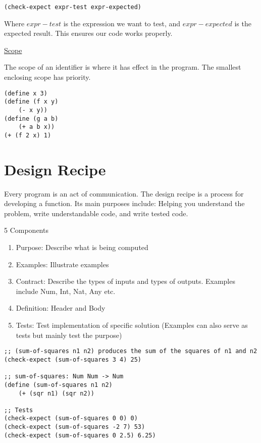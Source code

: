 \documentclass{article}
\begin{document}
\begin{lstlisting}
(check-expect expr-test expr-expected)
\end{lstlisting}

Where $expr-test$ is the expression we want to test, and $expr-expected$ is the expected result. This ensures our code works properly. 

\underline{Scope}

The scope of an identifier is where it has effect in the program. The smallest enclosing scope has priority. 

\begin{lstlisting}
(define x 3)
(define (f x y)
    (- x y))
(define (g a b)
    (+ a b x))
(+ (f 2 x) 1)
\end{lstlisting}

\section{Design Recipe}

Every program is an act of communication. The design recipe is a process for developing a function. Its main purposes include: Helping you understand the problem, write understandable code, and write tested code. 

5 Components
\begin{enumerate}
    \item Purpose: Describe what is being computed
    \item Examples: Illustrate examples
    \item Contract: Describe the types of inputs and types of outputs. Examples include Num, Int, Nat, Any etc.
    \item Definition: Header and Body
    \item Tests: Test implementation of specific solution (Examples can also serve as tests but mainly test the purpose)
\end{enumerate}

\begin{lstlisting}
;; (sum-of-squares n1 n2) produces the sum of the squares of n1 and n2
(check-expect (sum-of-squares 3 4) 25)

;; sum-of-squares: Num Num -> Num
(define (sum-of-squares n1 n2)
    (+ (sqr n1) (sqr n2))

;; Tests
(check-expect (sum-of-squares 0 0) 0)
(check-expect (sum-of-squares -2 7) 53)
(check-expect (sum-of-squares 0 2.5) 6.25)
\end{lstlisting}
\end{document}
